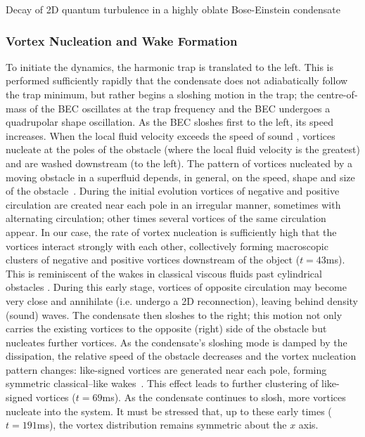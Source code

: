 \begin{chapter}{\label{cha:shin}Decay of 2D quantum turbulence in a highly oblate Bose-Einstein condensate}
\subsubsection{Vortex Nucleation and Wake Formation}

To initiate the dynamics, the harmonic trap is translated to the left.  This is performed sufficiently rapidly that the condensate does not adiabatically follow the trap minimum, but rather begins a sloshing motion in the trap; the centre-of-mass of the BEC oscillates at the trap frequency and the BEC undergoes a quadrupolar shape oscillation.  As the BEC sloshes first to the left, its speed increases.  When the local fluid velocity exceeds the speed of sound \cite{frisch92}, vortices nucleate at the poles of the obstacle
(where the local fluid velocity is the greatest) 
and are washed downstream (to the left).  
The pattern of vortices nucleated by a moving obstacle 
in a superfluid depends, in general, on the  speed, shape and size of 
the obstacle~\citep{jma00,sasaki_suzuki_10,stagg_parker_14}. 
During the initial evolution vortices of negative
and positive circulation are created near each pole in an 
irregular manner, sometimes with alternating circulation;  
other times several vortices of the same circulation appear.  
In our case, the rate of vortex nucleation is sufficiently 
high that the vortices interact strongly with each other, 
collectively forming macroscopic clusters of negative and positive 
vortices downstream of the object ($t=43$ms).  This is reminiscent of the wakes in classical viscous fluids past cylindrical obstacles \cite{stagg_parker_14}.  
During this early stage, vortices of opposite 
circulation may become very close and annihilate (i.e. undergo 
a 2D reconnection), leaving behind density (sound) waves. The condensate then sloshes to the right; this 
motion not only carries the existing vortices to the opposite 
(right) side of the obstacle but nucleates further vortices. 
As the condensate's sloshing mode is damped by 
the dissipation, the relative speed of the obstacle decreases
and the vortex nucleation pattern changes: 
like-signed vortices are generated near each pole, 
forming symmetric classical--like wakes~\cite{stagg_parker_14}. 
This effect leads to further clustering of like-signed vortices   
($t=69$ms). As the condensate continues to slosh, more
vortices nucleate into the system. It must be stressed that,
up to these early times ($t=191$ms), the vortex distribution remains symmetric 
about the $x$ axis.   %


\end{chapter}
